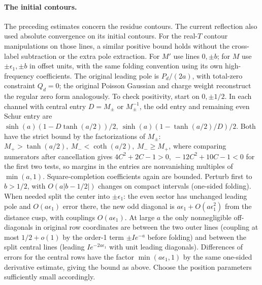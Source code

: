 \paragraph{The initial contours.}
The preceding estimates concern the residue contours. The current
reflection also used absolute convergence on its initial contours.
For the real-\(T\) contour manipulations on those lines, a similar positive bound holds without the cross-label subtraction or the extra pole extraction. For \(M'\) use lines \(0,\pm b\); for \(M\) use \(\pm\epsilon_1,\pm b\) in offset units, with the same folding convention using its own high-frequency coefficients. The original leading pole is \(P_d/(2a)\), with total-zero constraint \(Q_d=0\); the original Poisson Gaussian and charge weight reconstruct the regular zero form analogously. To check positivity, start on \(0,\pm1/2\). In each channel with central entry \(D=M_\pm\) or \(M_\pm^{-1}\), the odd entry and remaining even Schur entry are
\(\sinh(a)(1-D\tanh(a/2))/2,\ \sinh(a)(1-\tanh(a/2)/D)/2\). Both have the strict bound by the factorizations of \(M_\pm\): \(M_+>\tanh(a/2),\ M_-<\coth(a/2),\ M_-\ge M_+\), where comparing numerators after cancellation gives \(4C^2+2C-1>0,\ -12C^2+10C-1<0\) for the first two tests, so margins in the entries are nonvanishing multiples of \(\min(a,1)\). Square-completion coefficients again are bounded. Perturb first to \(b>1/2\), with \(O(a|b-1/2|)\) changes on compact intervals (one-sided folding). When needed split the center into \(\pm\epsilon_1\): the even sector has unchanged leading pole and \(O(a\epsilon_1)\) error there, the new odd diagonal is \(a\epsilon_1+O(a\epsilon_1^2)\) from the distance cusp, with couplings \(O(a\epsilon_1)\). At large \(a\) the only nonnegligible off-diagonals in original row coordinates are between the two outer lines (coupling at most \(1/2+o(1)\) by the order-1 term \(\pm I e^{-a}\) before folding) and between the split central lines (leading \(I e^{-2a\epsilon_1}\) with unit leading diagonals). Differences of errors for the central rows have the factor \(\min(a\epsilon_1,1)\) by the same one-sided derivative estimate, giving the bound as above. Choose the position parameters sufficiently small accordingly.

